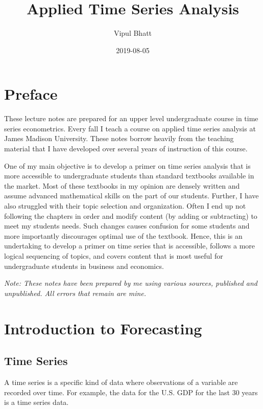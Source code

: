 \documentclass[]{book}
\title{Applied Time Series Analysis}
\author{Vipul Bhatt}
\date{2019-08-05}
\theoremstyle{definition}
\theoremstyle{definition}
\theoremstyle{definition}
\theoremstyle{remark}
\begin{document}
\maketitle

{
\setcounter{tocdepth}{1}
\tableofcontents
}
\hypertarget{preface}{%
\chapter*{Preface}\label{preface}}

These lecture notes are prepared for an upper level undergraduate course in time series econometrics. Every fall I teach a course on applied time series analysis at James Madison University. These notes borrow heavily from the teaching material that I have developed over several years of instruction of this course.

One of my main objective is to develop a primer on time series analysis that is more accessible to undergraduate students than standard textbooks available in the market. Most of these textbooks in my opinion are densely written and assume advanced mathematical skills on the part of our students. Further, I have also struggled with their topic selection and organization. Often I end up not following the chapters in order and modify content (by adding or subtracting) to meet my students needs. Such changes causes confusion for some students and more importantly discourages optimal use of the textbook. Hence, this is an undertaking to develop a primer on time series that is accessible, follows a more logical sequencing of topics, and covers content that is most useful for undergraduate students in business and economics.

\emph{Note: These notes have been prepared by me using various sources, published and unpublished. All errors that remain are mine.}

\hypertarget{intro}{%
\chapter{Introduction to Forecasting}\label{intro}}

\hypertarget{time-series}{%
\section{Time Series}\label{time-series}}

A time series is a specific kind of data where observations of a variable are recorded over time. For example, the data for the U.S. GDP for the last 30 years is a time series data.
\end{document}
